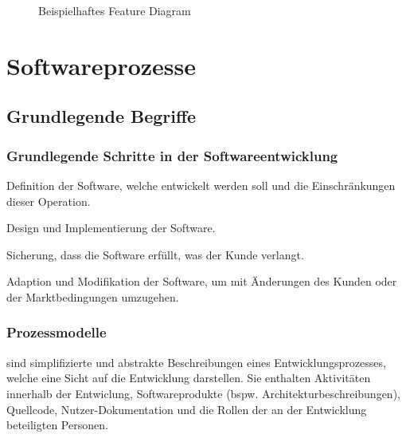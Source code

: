 \documentclass[ngerman,color=3b]{tuda_summary}
\begin{document}
\begin{figure}[ht]
    \caption{Beispielhaftes Feature Diagram}
\end{figure}

\clearpage
\section{Softwareprozesse}
\subsection{Grundlegende Begriffe}
\subsubsection{Grundlegende Schritte in der Softwareentwicklung}
\begin{definition}
    Definition der Software, welche entwickelt werden soll und die Einschränkungen dieser Operation.
\end{definition}
\begin{definition}
    Design und Implementierung der Software.
\end{definition}
\begin{definition}
    Sicherung, dass die Software erfüllt, was der Kunde verlangt.
\end{definition}
\begin{definition}
    Adaption und Modifikation der Software, um mit Änderungen des Kunden oder der Marktbedingungen umzugehen.
\end{definition}

\subsubsection{Prozessmodelle}
\begin{definition}[Softwareprozessmodelle]
    sind simplifizierte und abstrakte Beschreibungen eines Entwicklungsprozesses, welche eine Sicht auf die Entwicklung darstellen. Sie enthalten Aktivitäten innerhalb der Entwiclung, Softwareprodukte (bspw. Architekturbeschreibungen), Quellcode, Nutzer-Dokumentation und die Rollen der an der Entwicklung beteiligten Personen.
\end{definition}
\end{document}

